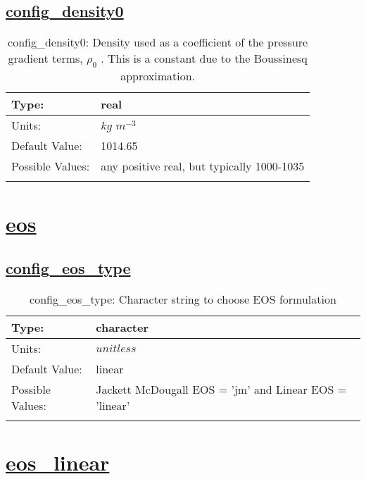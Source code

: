 \subsection[config\_density0]{\hyperref[sec:nm_tab_pressure_gradient]{config\_density0}}
\label{subsec:nm_sec_config_density0}
\begin{center}
\begin{longtable}{| p{2.0in} | p{4.0in} |}
    \hline
    Type: & real \\
    \hline
    Units: & $kg$ $m^{-3}$ \\
    \hline
    Default Value: & 1014.65 \\
    \hline
    Possible Values: & any positive real, but typically 1000-1035 \\
    \hline
    \caption{config\_density0:  Density used as a coefficient of the pressure gradient terms,  $\rho_0$ .  This is a constant due to the Boussinesq approximation.}
\end{longtable}
\end{center}
\section[eos]{\hyperref[sec:nm_tab_eos]{eos}}
\label{sec:nm_sec_eos}
\subsection[config\_eos\_type]{\hyperref[sec:nm_tab_eos]{config\_eos\_type}}
\label{subsec:nm_sec_config_eos_type}
\begin{center}
\begin{longtable}{| p{2.0in} | p{4.0in} |}
    \hline
    Type: & character \\
    \hline
    Units: & $unitless$ \\
    \hline
    Default Value: & linear \\
    \hline
    Possible Values: & Jackett McDougall EOS = 'jm' and Linear EOS = 'linear' \\
    \hline
    \caption{config\_eos\_type: Character string to choose EOS formulation}
\end{longtable}
\end{center}
\section[eos\_linear]{\hyperref[sec:nm_tab_eos_linear]{eos\_linear}}
\label{sec:nm_sec_eos_linear}
